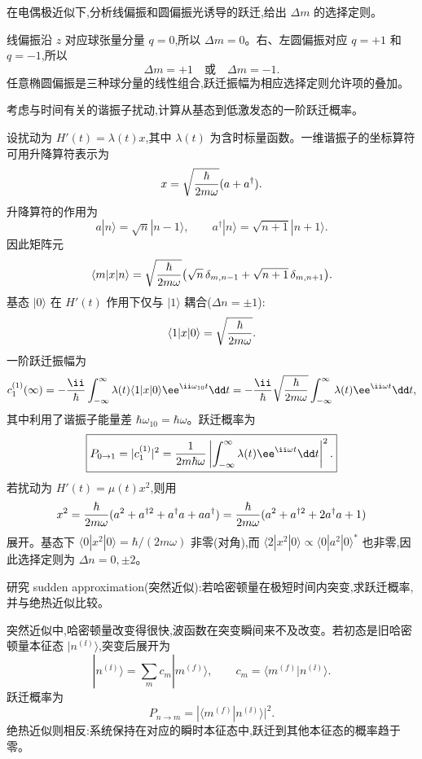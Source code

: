 \begin{question}
在电偶极近似下,分析线偏振和圆偏振光诱导的跃迁,给出 $\Delta m$ 的选择定则。
\begin{solution}
线偏振沿 $z$ 对应球张量分量 $q=0$,所以 $\Delta m=0$。右、左圆偏振对应 $q=+1$ 和 $q=-1$,所以
\[
\Delta m=+1\quad\text{或}\quad \Delta m=-1.
\]
任意椭圆偏振是三种球分量的线性组合,跃迁振幅为相应选择定则允许项的叠加。
\end{solution}
\end{question}

\begin{question}
考虑与时间有关的谐振子扰动,计算从基态到低激发态的一阶跃迁概率。
\begin{solution}
设扰动为 $H'(t)=\lambda(t)x$,其中 $\lambda(t)$ 为含时标量函数。一维谐振子的坐标算符可用升降算符表示为
\[
x=\sqrt{\hbar\over2m\omega}(a+a^\dagger).
\]
升降算符的作用为
\[
a|n\rangle=\sqrt{n}|n-1\rangle,\qquad
a^\dagger|n\rangle=\sqrt{n+1}|n+1\rangle.
\]
因此矩阵元
\[
\langle m|x|n\rangle=\sqrt{\hbar\over2m\omega}
\big(\sqrt{n}\,\delta_{m,n-1}+\sqrt{n+1}\,\delta_{m,n+1}\big).
\]
基态 $|0\rangle$ 在 $H'(t)$ 作用下仅与 $|1\rangle$ 耦合($\Delta n=\pm1$):
\[
\langle1|x|0\rangle=\sqrt{\hbar\over2m\omega}.
\]
一阶跃迁振幅为
\[
c_1^{(1)}(\infty)=-{\ii\over\hbar}\int_{-\infty}^{\infty}\lambda(t)
\langle1|x|0\rangle \ee^{\ii\omega_{10}t}\dd t
=-{\ii\over\hbar}\sqrt{\hbar\over2m\omega}\int_{-\infty}^{\infty}\lambda(t)\ee^{\ii\omega t}\dd t,
\]
其中利用了谐振子能量差 $\hbar\omega_{10}=\hbar\omega$。跃迁概率为
\[
\boxed{P_{0\to1}=|c_1^{(1)}|^2
= {1\over2m\hbar\omega}\left|\int_{-\infty}^{\infty}\lambda(t)\ee^{\ii\omega t}\dd t\right|^2.}
\]
若扰动为 $H'(t)=\mu(t)x^2$,则用
\[
x^2={\hbar\over2m\omega}(a^2+a^{\dagger2}+a^\dagger a+aa^\dagger)
={\hbar\over2m\omega}(a^2+a^{\dagger2}+2a^\dagger a+1)
\]
展开。基态下 $\langle0|x^2|0\rangle=\hbar/(2m\omega)$ 非零(对角),而 $\langle2|x^2|0\rangle\propto\langle0|a^2|0\rangle^*$ 也非零,因此选择定则为 $\Delta n=0,\pm2$。
\end{solution}
\end{question}

\begin{question}
研究 sudden approximation(突然近似):若哈密顿量在极短时间内突变,求跃迁概率,并与绝热近似比较。
\begin{solution}
突然近似中,哈密顿量改变得很快,波函数在突变瞬间来不及改变。若初态是旧哈密顿量本征态 $|n^{(\ii)}\rangle$,突变后展开为
\[
|n^{(\ii)}\rangle=\sum_m c_m|m^{(f)}\rangle,
\qquad
c_m=\langle m^{(f)}|n^{(\ii)}\rangle.
\]
跃迁概率为
\[
\boxed{P_{n\to m}=|\langle m^{(f)}|n^{(\ii)}\rangle|^2.}
\]
绝热近似则相反:系统保持在对应的瞬时本征态中,跃迁到其他本征态的概率趋于零。
\end{solution}
\end{question}

